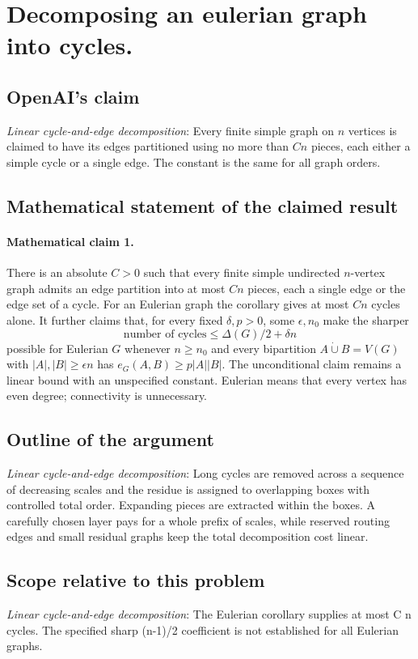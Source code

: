 \documentclass[11pt]{article}
\begin{document}
\section*{Decomposing an eulerian graph into cycles.}

\subsection{OpenAI's claim}
\textit{Linear cycle-and-edge decomposition}: Every finite simple graph on $n$ vertices is claimed to have its edges partitioned using no more than $Cn$ pieces, each either a simple cycle or a single edge. The constant is the same for all graph orders.

\subsection{Mathematical statement of the claimed result}
\paragraph{Mathematical claim 1.} There is an absolute $C>0$ such that every finite simple undirected $n$-vertex graph admits an edge partition into at most $Cn$ pieces, each a single edge or the edge set of a cycle. For an Eulerian graph the corollary gives at most $Cn$ cycles alone. It further claims that, for every fixed $\delta,p>0$, some $\epsilon,n_0$ make the sharper \[\text{number of cycles}\le\Delta(G)/2+\delta n\] possible for Eulerian $G$ whenever $n\ge n_0$ and every bipartition $A\mathbin{\dot\cup}B=V(G)$ with $|A|,|B|\ge\epsilon n$ has $e_G(A,B)\ge p|A||B|$. The unconditional claim remains a linear bound with an unspecified constant. Eulerian means that every vertex has even degree; connectivity is unnecessary.

\subsection{Outline of the argument}
\textit{Linear cycle-and-edge decomposition}: Long cycles are removed across a sequence of decreasing scales and the residue is assigned to overlapping boxes with controlled total order. Expanding pieces are extracted within the boxes. A carefully chosen layer pays for a whole prefix of scales, while reserved routing edges and small residual graphs keep the total decomposition cost linear.

\subsection{Scope relative to this problem}
\textit{Linear cycle-and-edge decomposition}: The Eulerian corollary supplies at most C n cycles. The specified sharp (n-1)/2 coefficient is not established for all Eulerian graphs.
\end{document}

